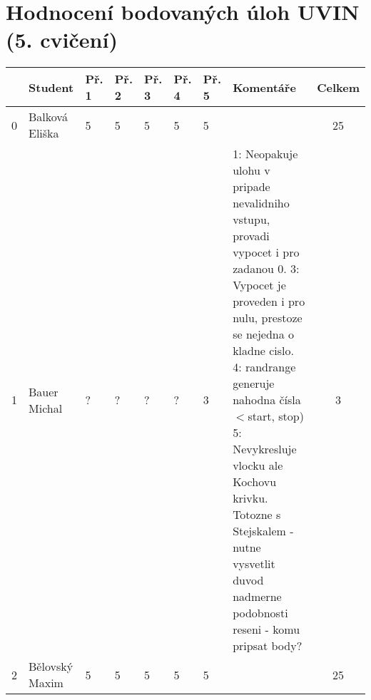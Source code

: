 \documentclass[landscape, 12pt]{article}
\begin{document}
\section*{Hodnocení bodovaných úloh UVIN (5. cvičení)}
       
        \begin{longtable}{|l l | C{0.7cm} | C{0.7cm} | C{0.7cm} | C{0.7cm} | C{0.7cm} | L{15cm} |c|}
\hline
    & Student            &   Př. 1 &   Př. 2 &   Př. 3 &   Př. 4 &   Př. 5 & Komentáře                                                                                                                                                                                                                                                                                                                                                                               &   Celkem \\
 & Balková Eliška     &       5 &       5 &       5 &       5 &       5 &                                                                                                                                                                                                                                                                                                                                                                                      &       25 \\
\hline

  1 & Bauer Michal       &       ? &       ? &       ? &       ? &       3 & 1: Neopakuje ulohu v pripade nevalidniho vstupu, provadi vypocet i pro zadanou 0. 3: Vypocet je proveden i pro nulu, prestoze se nejedna o kladne cislo. 4: randrange generuje nahodna čísla \ensuremath{<}start, stop) 5: Nevykresluje vlocku ale Kochovu krivku. Totozne s Stejskalem - nutne vysvetlit duvod nadmerne podobnosti reseni - komu pripsat body?                                                                                                                                                        &       3 \\
\hline

  2 & Bělovský Maxim     &       5 &       5 &       5 &       5 &       5 &                                                                                                                                                                                                                                                                                                                                                                                      &       25 \\


\end{longtable}
\end{document}
